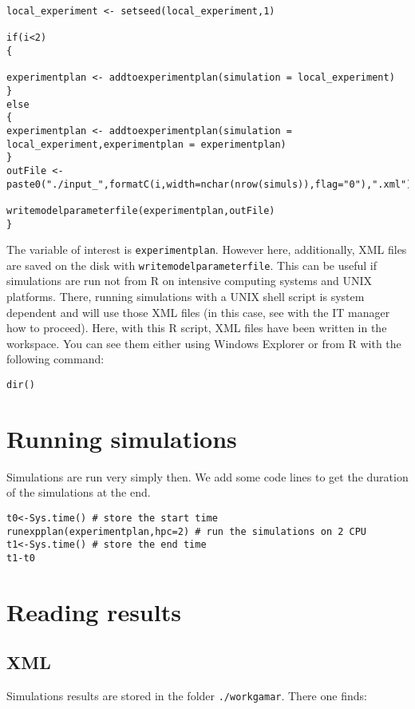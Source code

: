 \begin{lstlisting}
local_experiment <- setseed(local_experiment,1)

if(i<2)
{

experimentplan <- addtoexperimentplan(simulation = local_experiment)
}
else
{
experimentplan <- addtoexperimentplan(simulation = local_experiment,experimentplan = experimentplan)
}
outFile <- paste0("./input_",formatC(i,width=nchar(nrow(simuls)),flag="0"),".xml")

writemodelparameterfile(experimentplan,outFile)
}
\end{lstlisting}

The  variable of interest is \texttt{experimentplan}. However here, additionally, XML files are saved on the disk with \texttt{writemodelparameterfile}. This can be useful if simulations are run not from R on intensive computing systems and UNIX platforms. There, running simulations with a UNIX shell script is system dependent and will use those XML files (in this case, see with the IT manager how to proceed). Here, with this R script, XML files have been written in the workspace. You can see them either  using Windows Explorer or from R with the following command:

\begin{lstlisting}
dir()
\end{lstlisting}

\section{Running simulations}


Simulations are run very simply then. We add some code lines to get the duration of the simulations at the end.

\begin{lstlisting}
t0<-Sys.time() # store the start time
runexpplan(experimentplan,hpc=2) # run the simulations on 2 CPU
t1<-Sys.time() # store the end time
t1-t0
\end{lstlisting}


\section{Reading results}

\subsection{XML}

Simulations results are stored in the folder \texttt{./workgamar}. There one finds:

